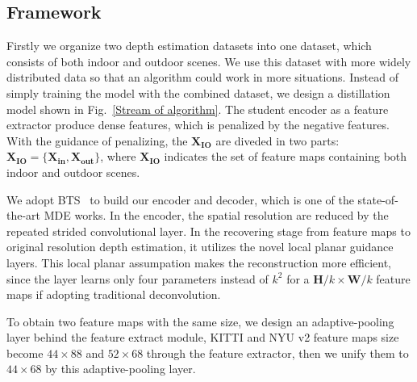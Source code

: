 \documentclass{svjour3}                     %
\begin{document}
\subsection{Framework}
Firstly we organize two depth estimation datasets
into one dataset, which consists of both indoor and
outdoor scenes. We use this dataset with more widely distributed data 
so that an algorithm 
could work in more situations.
Instead of simply training the model with the combined dataset, we design a distillation model shown in Fig.~\ref{Stream of algorithm}. The student encoder as a feature extractor produce dense
features, which is penalized by the negative features. With the 
guidance of penalizing, the $\mathbf{X_{IO}}$ are diveded in two parts:
$\mathbf{X_{IO}} = \{\mathbf{X_{in}},\mathbf{X_{out}}\}$, where $\mathbf{X_{IO}}$ indicates the set of feature maps containing both indoor 
and outdoor scenes.

We adopt BTS~\cite{bts} to build our encoder and decoder, which is one of the state-of-the-art MDE works. In the encoder, the spatial resolution are reduced by the repeated strided convolutional layer. In the recovering stage from 
feature maps to original resolution depth estimation, it 
utilizes the novel local planar guidance layers. This local
planar assumpation
makes the reconstruction more efficient, since the layer
learns only four parameters instead of $k^2$ for a $\textbf{H}/k\times\textbf{W}/k$ feature maps if adopting traditional deconvolution.
 
To obtain two feature maps with the same size, we design an
adaptive-pooling layer behind the feature extract module,
KITTI and NYU v2 feature maps size become $44\times88$
and $52\times68$ through the feature extractor, then we 
unify them to $44\times68$ by this adaptive-pooling layer.
\end{document}
